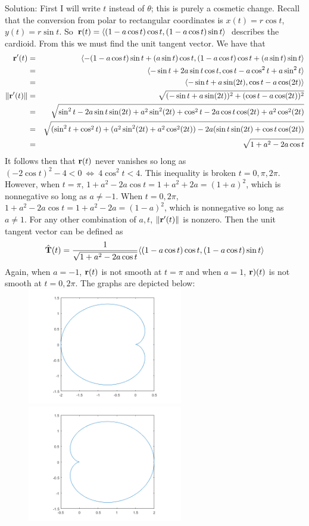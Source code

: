 \documentclass[12pt]{amsbook}
\newcommand{\la}{\langle}
\newcommand{\ra}{\rangle}
\begin{document}
{\sc Solution}: First I will write $t$ instead of $\theta$; this is purely a cosmetic change. Recall that the conversion from polar to rectangular coordinates is $x(t)=r\cos t$, $y(t)=r\sin t$. So ${\bf r}(t)=\la (1-a\cos t)\cos t, (1-a\cos t)\sin t\ra$ describes the cardioid. From this we must find the unit tangent vector. We have that
\begin{eqnarray*}
{\bf r}'(t)&=&\la -(1-a\cos t)\sin t+(a\sin t)\cos   t, (1-a\cos t)\cos t+(a\sin t)\sin t \ra \\
&=& \la -\sin t+2a\sin t\cos t, \cos t-a\cos^2 t+a\sin^2 t \ra\\
&=&\la -\sin t+a\sin (2t), \cos t-a\cos(2t) \ra\\
\|{\bf r}'(t)\|&=&\sqrt{(-\sin t+a\sin (2t))^2+(\cos t-a\cos(2t))^2}\\
&=&\sqrt{\sin^2 t -2a\sin t\sin(2t) +a^2\sin^2 (2t)+\cos^2 t -2a\cos t\cos(2t) +a^2\cos^2 (2t)}\\
&=&\sqrt{(\sin^2 t+\cos^2 t)+(a^2\sin^2 (2t)+a^2\cos^2 (2t))-2a(\sin t\sin(2t)+\cos t\cos(2t))}\\
&=&\sqrt{1+a^2-2a\cos t}
\end{eqnarray*}
It follows then that ${\bf r}(t)$ never vanishes so long as $(-2\cos t)^2-4 <0 \ \Leftrightarrow \ 4\cos^2 t <4$. This inequality is broken $t=0, \pi, 2\pi$. However, when $t=\pi$, $1+a^2-2a\cos t= 1+a^2+2a=(1+a)^2$, which is nonnegative so long as $a\neq -1$. When $t=0, 2\pi$, $1+a^2-2a\cos t= 1+a^2-2a=(1-a)^2$, which is nonnegative so long as $a\neq 1$. For any other combination of $a,t$, $\|{\bf r}'(t)\|$ is nonzero. Then the unit tangent vector can be defined as
$$\hat{\bf T}(t)=\frac{1}{\sqrt{1+a^2-2a\cos t}}\la (1-a\cos t)\cos t, (1-a\cos t)\sin t\ra$$
Again, when $a=-1$, ${\bf r}(t)$ is not smooth at $t=\pi$ and when $a=1$, ${\bf r})(t)$ is not smooth at $t=0, 2\pi$. The graphs are depicted below:
\includegraphics[width=3.5in,height=2.0in]{2_11_13_1.png}
\includegraphics[width=3.5in,height=2.0in]{2_11_13_5.png}
\end{document}
